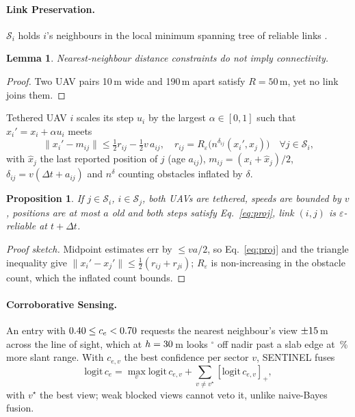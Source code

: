 \documentclass{IOS-Book-Article}
\newif\ifhighlight
\newenvironment{revised}{\ifhighlight\color{blue}\fi}{}
\newtheorem{lemma}{Lemma}
\newtheorem{proposition}{Proposition}
\begin{document}
\begin{revised}
\paragraph{Link Preservation.} $\mathcal{S}_i$ holds $i$'s neighbours in the local minimum spanning
tree of reliable links \cite{li2003lmst}.
\begin{lemma}\label{lem:nn}
Nearest-neighbour distance constraints do not imply connectivity.
\end{lemma}
\begin{proof}
Two UAV pairs 10\,m wide and 190\,m apart satisfy $R=50$\,m, yet no link joins them.
\end{proof}
Tethered UAV $i$ scales its step $u_i$ by the largest $\alpha\in[0,1]$ such that $x_i'=x_i+\alpha u_i$ meets
\begin{equation}
\|x_i'-m_{ij}\|\le\tfrac12 r_{ij}-\tfrac12 v\,a_{ij},\quad r_{ij}=R_\varepsilon\big(n^{\delta_{ij}}(x_i',\hat x_j)\big)\quad\forall j\in\mathcal{S}_i,\label{eq:proj}
\end{equation}
with $\hat x_j$ the last reported position of $j$ (age $a_{ij}$), $m_{ij}=(x_i+\hat x_j)/2$,
$\delta_{ij}=v(\Delta t+a_{ij})$ and $n^\delta$ counting obstacles inflated by $\delta$.
\begin{proposition}\label{prop:link}
If $j\in\mathcal{S}_i$, $i\in\mathcal{S}_j$, both UAVs are tethered, speeds are bounded by $v$,
positions are at most $a$ old and both steps satisfy Eq.~\eqref{eq:proj}, link $(i,j)$ is
$\varepsilon$-reliable at $t+\Delta t$.
\end{proposition}
\begin{proof}[Proof sketch]
Midpoint estimates err by $\le va/2$, so Eq.~\eqref{eq:proj} and the triangle inequality give
$\|x_i'-x_j'\|\le\frac12(r_{ij}+r_{ji})$; $R_\varepsilon$ is non-increasing in the obstacle count, which
the inflated count bounds.
\end{proof}

\paragraph{Corroborative Sensing.} An entry with $0.40\le c_e<0.70$ requests the nearest neighbour's
view $\pm15$\,m across the line of sight, which at $h=30$\,m looks \nFlankAngle$^\circ$
off nadir past a slab edge at \nFlankSlant\,\% more slant range. With $c_{e,v}$ the best confidence
per sector $v$, SENTINEL fuses
\begin{equation}
\mathrm{logit}\,c_e=\max_v\mathrm{logit}\,c_{e,v}+\sum_{v\ne v^\star}[\mathrm{logit}\,c_{e,v}]_+,\label{eq:fusion}
\end{equation}
with $v^\star$ the best view; weak blocked views cannot veto it, unlike naive-Bayes fusion.
\end{revised}
\end{document}
